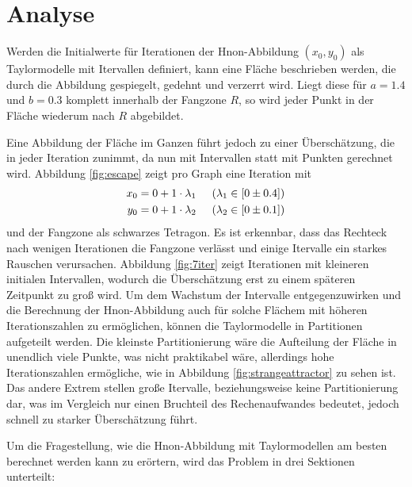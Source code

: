 
\chapter{Analyse}
\label{ch:Analyse}
Werden die Initialwerte für Iterationen der H\e non-Abbildung $(x_0, y_0)$ als Taylormodelle mit Itervallen definiert, kann eine Fläche beschrieben werden, die durch die Abbildung gespiegelt, gedehnt und verzerrt wird. Liegt diese für $a=1.4$ und $b=0.3$ komplett innerhalb der Fangzone $R$, so wird jeder Punkt in der Fläche wiederum nach $R$ abgebildet. 


Eine Abbildung der Fläche im Ganzen führt jedoch zu einer Überschätzung, die in jeder Iteration zunimmt, da nun mit Intervallen statt mit Punkten gerechnet wird. Abbildung \ref{fig:escape} zeigt pro Graph eine Iteration mit 
\begin{align*}
x_0 = 0 + 1 \cdot \lambda_1 & \hspace{0.5cm} (\lambda_1 \in [0 \pm 0.4]) \\
 y_0 = 0 + 1 \cdot \lambda_2 & \hspace{0.5cm} (\lambda_2 \in [0 \pm 0.1])
\end{align*}
und der Fangzone als schwarzes Tetragon. Es ist erkennbar, dass das Rechteck nach wenigen Iterationen die Fangzone verlässt und einige Itervalle ein starkes Rauschen verursachen. Abbildung \ref{fig:7iter} zeigt  Iterationen mit kleineren initialen Intervallen, wodurch die Überschätzung erst zu einem späteren Zeitpunkt zu groß wird. Um dem Wachstum der Intervalle entgegenzuwirken und die Berechnung der H\e non-Abbildung auch für solche Flächem mit höheren Iterationszahlen zu ermöglichen, können die Taylormodelle in Partitionen aufgeteilt werden.  Die kleinste Partitionierung wäre die Aufteilung der Fläche in unendlich viele Punkte, was nicht praktikabel wäre, allerdings hohe Iterationszahlen ermögliche, wie in Abbildung \ref{fig:strangeattractor} zu sehen ist. Das andere Extrem stellen große Itervalle, beziehungsweise keine Partitionierung dar, was im Vergleich nur einen Bruchteil des Rechenaufwandes bedeutet, jedoch schnell zu starker Überschätzung führt.

Um die Fragestellung, wie die H\e non-Abbildung mit Taylormodellen am besten berechnet werden kann zu erörtern, wird das Problem in drei Sektionen unterteilt:

